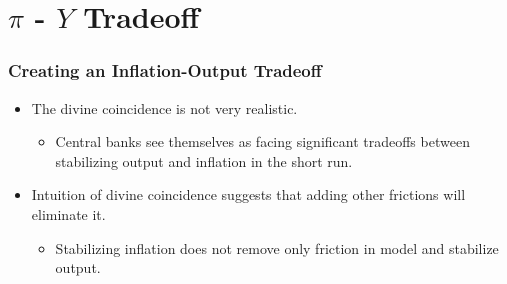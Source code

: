 \documentclass[english,xcolor=svgnames]{beamer}
\begin{document}
%


\section{$\pi$ - $Y$ Tradeoff}


\begin{frame}
\frametitle{Creating an Inflation-Output Tradeoff}
\begin{itemize}
	\item The divine coincidence is not very realistic.
	\begin{itemize}
		\item Central banks see themselves as facing significant tradeoffs
between stabilizing output and inflation in the short run.
	\end{itemize}
	\item Intuition of divine coincidence suggests that adding other frictions will eliminate it.
	\begin{itemize}
		\item Stabilizing inflation does not remove only friction in model and stabilize output.
	\end{itemize}
\end{itemize}
\end{frame}
\end{document}
